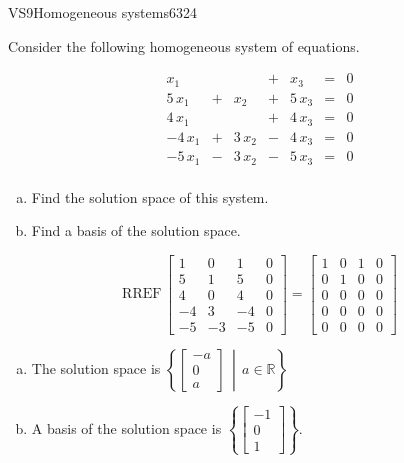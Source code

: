 \begin{exercise}{VS9}{Homogeneous systems}{6324} 
\begin{exerciseStatement} 

Consider the following homogeneous system of equations.

 \[\begin{matrix}
 x_{1} &  &  &  +  & x_{3} & = & 0 \\
 5 \, x_{1} &  +  & x_{2} &  +  & 5 \, x_{3} & = & 0 \\
 4 \, x_{1} &  &  &  +  & 4 \, x_{3} & = & 0 \\
 -4 \, x_{1} &  +  & 3 \, x_{2} &  -  & 4 \, x_{3} & = & 0 \\
 -5 \, x_{1} &  -  & 3 \, x_{2} &  -  & 5 \, x_{3} & = & 0 \\
 \end{matrix}\] 

\begin{enumerate}[(a)]
\item  Find the solution space of this system.
\item  Find a basis of the solution space.
\end{enumerate}

     \end{exerciseStatement}
 \begin{exerciseAnswer} 

\[\mathrm{RREF}\,\left[\begin{array}{ccc|c}
1 & 0 & 1 & 0 \\
5 & 1 & 5 & 0 \\
4 & 0 & 4 & 0 \\
-4 & 3 & -4 & 0 \\
-5 & -3 & -5 & 0
\end{array}\right]=\left[\begin{array}{ccc|c}
1 & 0 & 1 & 0 \\
0 & 1 & 0 & 0 \\
0 & 0 & 0 & 0 \\
0 & 0 & 0 & 0 \\
0 & 0 & 0 & 0
\end{array}\right]\]

 

\begin{enumerate}[(a)]
\item The solution space is \( \left\{ \left[\begin{array}{c}
-a \\
0 \\
a
\end{array}\right] \,\middle|\, a \in\mathbb R \right\} \) 
\item A basis of the solution space is \(\left\{ \left[\begin{array}{c}
-1 \\
0 \\
1
\end{array}\right] \right\}\).
\end{enumerate}

     \end{exerciseAnswer}
 \end{exercise}


